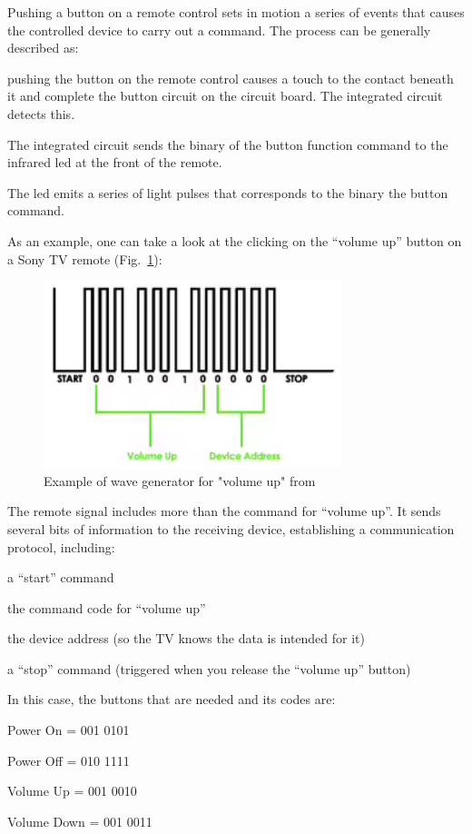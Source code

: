 Pushing a button on a remote control sets in motion a series of events
that causes the controlled device to carry out a command. The process
can be generally described as:
\begin{enum-c}
\item 
pushing the button on the remote control causes a touch to the contact beneath it and complete the button circuit on the circuit board. The integrated circuit detects this.
\item 
The integrated circuit sends the binary of the button function command to the
infrared \gls{led} at the front of the remote.
\item 
The \gls{led} emits a series of light pulses that corresponds to the binary the button command.
\end{enum-c}

As an example, one can take a look at the clicking on the ``volume up'' button
on a Sony TV remote (Fig.~\ref{fig:btncode}):
%
\begin{figure}[htb!]
\centering
    \includegraphics[width=0.45\columnwidth]{./img/buttoncode.png}
  \caption{Example of wave generator for "volume up" from~\cite{btncode}}%
\label{fig:btncode}
\end{figure}

The remote signal includes more than the command for ``volume up''. It sends
several bits of information to the receiving device, establishing a
communication protocol, including:
\begin{item-c}
\item a ``start'' command
\item the command code for ``volume up''
\item the device address (so the TV knows the data is intended for it)
\item a ``stop'' command (triggered when you release the ``volume up'' button)
\end{item-c}

In this case, the buttons that are needed and its codes are:
\begin{item-c}
\item
Power On = 001 0101
\item
Power Off = 010 1111
\item
Volume Up = 001 0010
\item
Volume Down = 001 0011
\end{item-c}

